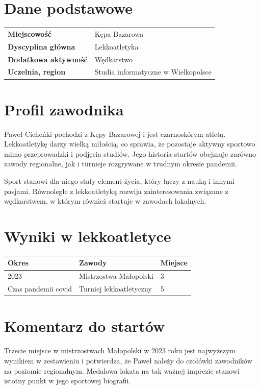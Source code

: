 \section*{Dane podstawowe}
\begin{tabularx}{\textwidth}{@{}lX@{}}
\toprule
\textbf{Miejscowość} & Kępa Bazarowa \\
\textbf{Dyscyplina główna} & Lekkoatletyka \\
\textbf{Dodatkowa aktywność} & Wędkarstwo \\
\textbf{Uczelnia, region} & Studia informatyczne w Wielkopolsce \\
\bottomrule
\end{tabularx}

\vspace{0.4cm}

\section*{Profil zawodnika}
Paweł Cicheńki pochodzi z Kępy Bazarowej i jest czarnoskórym atletą. Lekkoatletykę darzy wielką miłością, co sprawia, że pozostaje aktywny sportowo mimo przeprowadzki i podjęcia studiów. Jego historia startów obejmuje zarówno zawody regionalne, jak i turnieje rozgrywane w trudnym okresie pandemii.

Sport stanowi dla niego stały element życia, który łączy z nauką i innymi pasjami. Równolegle z lekkoatletyką rozwija zainteresowania związane z wędkarstwem, w którym również startuje w zawodach lokalnych.

\section*{Wyniki w lekkoatletyce}
\begin{tabularx}{\textwidth}{@{}lXl@{}}
\toprule
\textbf{Okres} & \textbf{Zawody} & \textbf{Miejsce} \\
\midrule
2023 & Mistrzostwa Małopolski & 3 \\
Czas pandemii covid & Turniej lekkoatletyczny & 5 \\
\bottomrule
\end{tabularx}

\vspace{0.4cm}

\section*{Komentarz do startów}
Trzecie miejsce w mistrzostwach Małopolski w 2023 roku jest najwyższym wynikiem w zestawieniu i potwierdza, że Paweł należy do czołówki zawodników na poziomie regionalnym. Medalowa lokata na tak ważnej imprezie stanowi istotny punkt w jego sportowej biografii.

